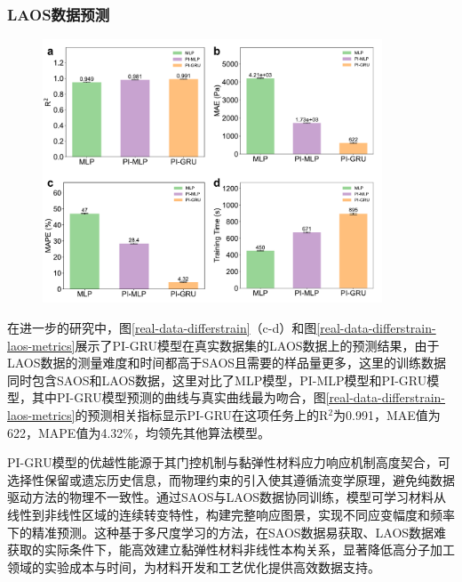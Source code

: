 \subsubsection{LAOS数据预测}
\begin{figure}
  \centering
  \includegraphics[width=0.9\textwidth]{Fig/real-data-differstrain-laos-metrics.pdf}
\end{figure}


在进一步的研究中，图\ref{real-data-differstrain}（c-d）和图\ref{real-data-differstrain-laos-metrics}展示了PI-GRU模型在真实数据集的LAOS数据上的预测结果，由于LAOS数据的测量难度和时间都高于SAOS且需要的样品量更多，这里的训练数据同时包含SAOS和LAOS数据，这里对比了MLP模型，PI-MLP模型和PI-GRU模型，其中PI-GRU模型预测的曲线与真实曲线最为吻合，图\ref{real-data-differstrain-laos-metrics}的预测相关指标显示PI-GRU在这项任务上的R$^2$为0.991，MAE值为622，MAPE值为4.32\%，均领先其他算法模型。

PI-GRU模型的优越性能源于其门控机制与黏弹性材料应力响应机制高度契合，可选择性保留或遗忘历史信息，而物理约束的引入使其遵循流变学原理，避免纯数据驱动方法的物理不一致性。通过SAOS与LAOS数据协同训练，模型可学习材料从线性到非线性区域的连续转变特性，构建完整响应图景，实现不同应变幅度和频率下的精准预测。这种基于多尺度学习的方法，在SAOS数据易获取、LAOS数据难获取的实际条件下，能高效建立黏弹性材料非线性本构关系，显著降低高分子加工领域的实验成本与时间，为材料开发和工艺优化提供高效数据支持。

